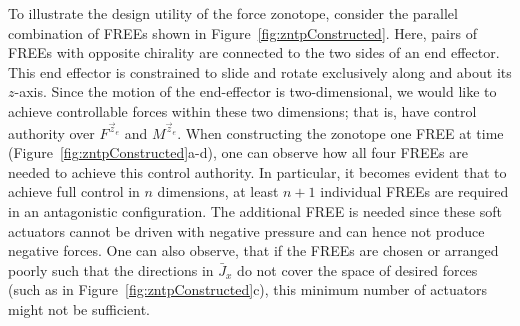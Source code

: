 To illustrate the design utility of the force zonotope, consider the parallel combination of FREEs shown in Figure~\ref{fig:zntpConstructed}.
Here, pairs of FREEs with opposite chirality are connected to the two sides of an end effector.
This end effector is constrained to slide and rotate exclusively along and about its $z$-axis.
Since the motion of the end-effector is two-dimensional, we would like to achieve controllable forces within these two dimensions; that is, have control authority over $F^{\vec{z}_e}$ and $M^{\vec{z}_e}$.
When constructing the zonotope one FREE at time (Figure~\ref{fig:zntpConstructed}a-d), one can observe how all four FREEs are needed to achieve this control authority.
In particular, it becomes evident that to achieve full control in $n$ dimensions, at least $n+1$ individual FREEs are required in an antagonistic configuration.
The additional FREE is needed since these soft actuators cannot be driven with negative pressure and can hence not produce negative forces.
One can also observe, that if the FREEs are chosen or arranged poorly such that the directions in $\bar{J}_{x}$ do not cover the space of desired forces (such as in Figure~\ref{fig:zntpConstructed}c), this minimum number of actuators might not be sufficient.
























